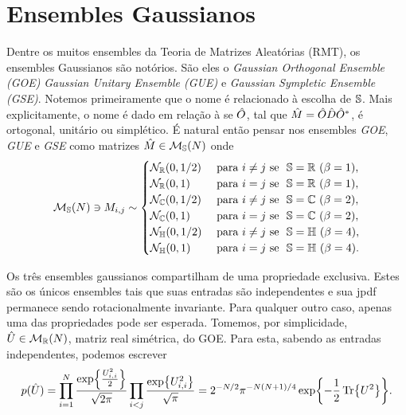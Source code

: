 \section{Ensembles Gaussianos}
\label{Section: Ensembles Gaussianos}

Dentre os muitos ensembles da Teoria de Matrizes Aleatórias (RMT), os ensembles Gaussianos são notórios. São eles o \textit{Gaussian Orthogonal Ensemble (GOE)} \textit{Gaussian Unitary Ensemble (GUE)} e \textit{Gaussian Sympletic Ensemble (GSE)}. Notemos primeiramente que o nome é relacionado à escolha de $\mathbb{S}$. Mais explicitamente, o nome é dado em relação à se $\hat O$, tal que $\hat M = \hat O\hat D\hat O^*$, é ortogonal, unitário ou simplético. É natural então pensar nos ensembles \textit{GOE}, \textit{GUE} e \textit{GSE} como matrizes $\hat M \in \mathcal{M}_{\mathbb{S}}(N)$ onde 
$$
\mathcal{M}_{\Se}(N) \ni M_{i,j} \sim
\begin{cases}
	\mathcal{N}_{\R}(0,1/2) &  \ \text{para} \ i \neq j \ \text{se} \ \ \Se = \R \ (\beta = 1),\\
	\mathcal{N}_{\R}(0,1) & \ \text{para} \ i = j \ \text{se} \ \ \Se = \R \ (\beta = 1),\\
	\mathcal{N}_{\C}(0,1/2)  & \ \text{para} \ i \neq j \ \text{se} \ \ \Se = \C \ (\beta = 2),\\
	\mathcal{N}_{\C}(0,1) & \ \text{para} \ i = j \ \text{se} \ \ \Se = \C \ (\beta = 2),\\
	\mathcal{N}_{\He}(0,1/2) & \ \text{para} \ i \neq j \ \text{se} \ \ \Se = \He \ (\beta = 4), \\
	\mathcal{N}_{\He}(0,1) & \ \text{para} \ i = j \ \text{se} \ \ \Se = \He \ (\beta = 4).
\end{cases}
$$

Os três ensembles gaussianos compartilham de uma propriedade exclusiva. Estes são os únicos ensembles tais que suas entradas são independentes e sua jpdf permanece sendo rotacionalmente invariante. Para qualquer outro caso, apenas uma das propriedades pode ser esperada. Tomemos, por simplicidade, $\hat U \in \mathcal{M}_{\mathbb{R}}(N)$, matriz real simétrica, do GOE. Para esta, sabendo as entradas independentes, podemos escrever $$p(\hat U) = \prod_{i=1}^{N}\frac{\exp{\frac{U_{i,i}^2}{2}}}{\sqrt{2\pi}} \prod_{i<j} \frac{\exp{U_{i,i}^2}}{\sqrt{\pi}} = 2^{-N/2} \pi^{-N(N + 1)/4} \exp{-\frac{1}{2} \Tr{U^2}}.$$

